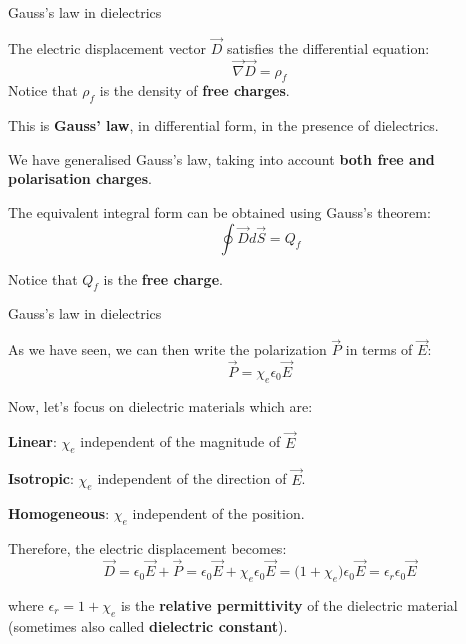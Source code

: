 %
%
%

\begin{frame}{Gauss's law in dielectrics}

The electric displacement vector $\vec{D}$ satisfies the differential equation:
\begin{equation*}
   \vec{\nabla} \vec{D} = \rho_f
\end{equation*}
Notice that $\rho_f$ is the density of {\bf free charges}.\\

\vspace{0.3cm}

This is {\bf Gauss' law}, in differential form, in the presence of dielectrics.\\

\vspace{0.2cm}

We have generalised Gauss's law, taking into account {\bf both free and polarisation charges}.\\

\vspace{0.2cm}

The equivalent integral form can be obtained using Gauss's theorem:
\begin{equation*}
   \oint \vec{D} d\vec{S} = Q_f
\end{equation*}

Notice that $Q_f$ is the {\bf free charge}.

\end{frame}


%
%
%

\begin{frame}{Gauss's law in dielectrics}

As we have seen, we can then write the
polarization $\vec{P}$ in terms of $\vec{E}$:
\begin{equation*}
  \vec{P} = \chi_{e} \epsilon_0 \vec{E}
\end{equation*}

\vspace{0.3cm}

Now, let's focus on dielectric materials which are:
\begin{itemize}
{\small
  \item {\bf Linear}: $\chi_{e}$ independent of the magnitude of $\vec{E}$
  \item {\bf Isotropic}: $\chi_{e}$ independent of the direction of $\vec{E}$.
  \item {\bf Homogeneous}: $\chi_{e}$ independent of the position.
}
\end{itemize}

Therefore, the electric displacement becomes:
\begin{equation*}
   \vec{D} = \epsilon_0 \vec{E} + \vec{P}
           = \epsilon_0 \vec{E} + \chi_{e} \epsilon_0 \vec{E}
           = \Big( 1 + \chi_{e} \Big) \epsilon_0 \vec{E}
           = \epsilon_{r} \epsilon_0 \vec{E}
\end{equation*}

where $\epsilon_{r} = 1 + \chi_{e}$ is the {\bf relative permittivity} of the dielectric material
(sometimes also called {\bf dielectric constant}).

\end{frame}


